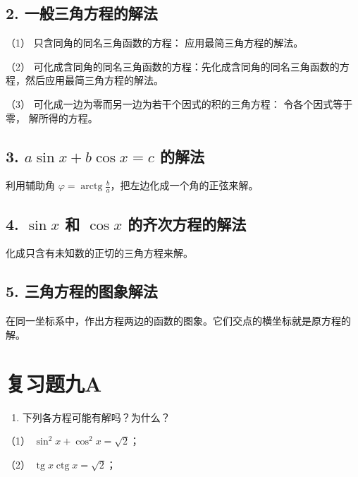 \subsection{2. 一般三角方程的解法}

（1） 只含同角的同名三角函数的方程： 应用最简三角方程的解法。

（2）
可化成含同角的同名三角函数的方程：先化成含同角的同名三角函数的方程，然后应用最简三角方程的解法。

（3） 可化成一边为零而另一边为若干个因式的积的三角方程：
令各个因式等于零， 解所得的方程。

\subsection{\texorpdfstring{3. \(a \sin x + b \cos x = c\) 的解法}{3. a \textbackslash sin x + b \textbackslash cos x = c 的解法}}\label{a-sin-x-b-cos-x-c-ux7684ux89e3ux6cd5}

利用辅助角
\(\varphi = \operatorname{arctg}\frac{b}{a}\)，把左边化成一个角的正弦来解。

\subsection{\texorpdfstring{4. \(\sin x\) 和 \(\cos x\) 的齐次方程的解法}{4. \textbackslash sin x 和 \textbackslash cos x 的齐次方程的解法}}\label{sin-x-ux548c-cos-x-ux7684ux9f50ux6b21ux65b9ux7a0bux7684ux89e3ux6cd5-1}

化成只含有未知数的正切的三角方程来解。

\subsection{5. 三角方程的图象解法}

在同一坐标系中，作出方程两边的函数的图象。它们交点的横坐标就是原方程的解。

\section{复习题九A}

\begin{enumerate}
\item
  下列各方程可能有解吗？为什么？
\end{enumerate}

（1） \(\sin^2 x + \cos^2 x = \sqrt{2}\)；

（2） \(\operatorname{tg} x \operatorname{ctg} x = \sqrt{2}\)；

